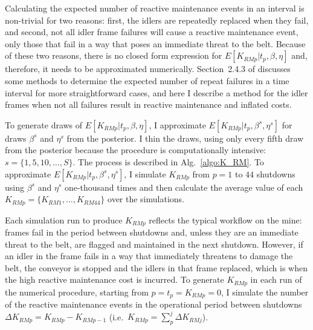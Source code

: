 Calculating the expected number of reactive maintenance events in an interval is non-trivial for two reasons: first, the idlers are repeatedly replaced when they fail, and second, not all idler frame failures will cause a reactive maintenance event, only those that fail in a way that poses an immediate threat to the belt. Because of these two reasons, there is no closed form expression for $E[K_{RM p}|t_p,\beta,\eta]$ and, therefore, it needs to be approximated numerically. Section~2.4.3 of \citet{jardine2013} discusses some methods to determine the expected number of repeat failures in a time interval for more straightforward cases, and here I describe a method for the idler frames when not all failures result in reactive maintenance and inflated costs.

To generate draws of $E[K_{RM p}|t_p,\beta,\eta]$, I approximate $E[K_{RM p}|t_p,\beta^s,\eta^s]$ for draws $\beta^s$ and $\eta^s$ from the posterior. I thin the draws, using only every fifth draw from the posterior because the procedure is computationally intensive: $s = \{1,5, 10, \dots, S\}$. The process is described in Alg.~\ref{algo:K_RM}. To approximate $E[K_{RM p}|t_p,\beta^s,\eta^s]$, I simulate $K_{RM p}$ from $p = 1$ to $44$ shutdowns using $\beta^s$ and $\eta^s$ one-thousand times and then calculate the average value of each $K_{RM p} = \{K_{RM 1}, \dots, K_{RM 44}\}$ over the simulations. 

Each simulation run to produce $K_{RM p}$ reflects the typical workflow on the mine: frames fail in the period between shutdowns and, unless they are an immediate threat to the belt, are flagged and maintained in the next shutdown. However, if an idler in the frame fails in a way that immediately threatens to damage the belt, the conveyor is stopped and the idlers in that frame replaced, which is when the high reactive maintenance cost is incurred. To generate $K_{RM p}$ in each run of the numerical procedure, starting from $p = t_p = K_{RM p} = 0$, I simulate the number of the reactive maintenance events in the operational period between shutdowns $\Delta K_{RM p} = K_{RM p} - K_{RM p-1}$ (i.e.\ $K_{RM p} = \sum_{p}^{j} \Delta K_{RM j}$). 

